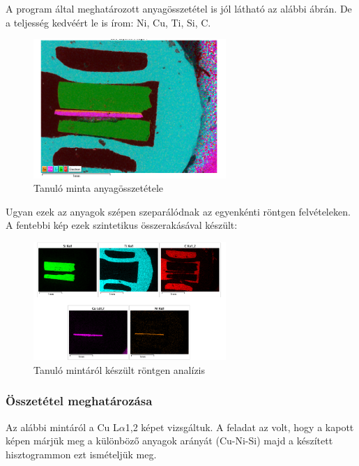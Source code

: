 \documentclass[a4paper,12pt]{article}
\begin{document}
\par A program által meghatározott anyagösszetétel is jól látható az alábbi ábrán. De a teljesség kedvéért
le is írom: Ni, Cu, Ti, Si, C.

\begin{figure}[H]
	\centering
	\includegraphics[width=0.65\textwidth, height=0.45\textwidth]{Jcsop/elsoanyag.png}
	\caption{Tanuló minta anyagösszetétele}
\end{figure}

\par Ugyan ezek az anyagok szépen szeparálódnak az egyenkénti röntgen felvételeken. A fentebbi kép ezek
szintetikus összerakásával készült:

\begin{figure}[H]
	\centering
	\includegraphics[width=0.65\textwidth, height=0.45\textwidth]{Jcsop/elsortg.png}
	\caption{Tanuló mintáról készült röntgen analízis}
\end{figure}

\subsubsection{Összetétel meghatározása}

\par Az alábbi mintáról a Cu L$\alpha$1,2 képet vizsgáltuk. A feladat
az volt, hogy a kapott képen márjük meg a különböző anyagok arányát (Cu-Ni-Si)
majd a készített hisztogrammon ezt ismételjük meg.
\end{document}
